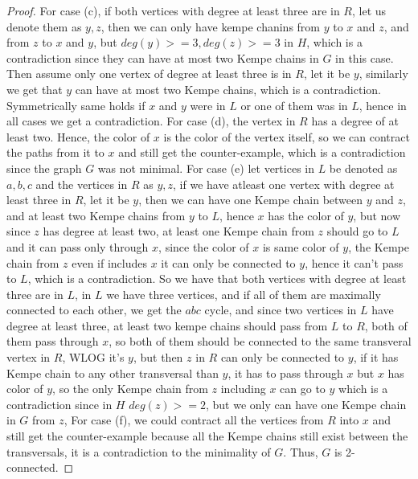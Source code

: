 \begin{proof}
    For case (c), if both vertices with degree at least three are in $R$, let us denote them as $y, z$, then we can only have kempe chanins from $y$
    to $x$ and $z$, and from $z$ to $x$ and $y$, but $deg(y) >= 3, deg(z) >= 3$ in $H$, which is a contradiction since they can have 
    at most two Kempe chains in $G$ in this case. Then assume only one vertex of degree at least three is in $R$, let it be $y$, similarly we get that $y$ can have
    at most two Kempe chains, which is a contradiction. Symmetrically same holds if $x$ and $y$ were in $L$ or one of them was in $L$, hence in all cases we get a contradiction.
    For case (d), the vertex in $R$ has a degree of at least two. Hence, the color of $x$ is the color of the vertex itself,
so we can contract the paths from it to $x$ and still get the counter-example, which is a contradiction since the graph $G$ was not minimal.
For case (e) let vertices in $L$ be denoted as $a,b,c$ and the vertices in $R$ as $y, z$, if we have atleast one vertex with degree at least three in $R$, let it be $y$, then we can have
one Kempe chain between $y$ and $z$, and at least two Kempe chains from $y$ to $L$, hence $x$ has the color of $y$, but now since $z$ has 
degree at least two, at least one Kempe chain from $z$ should go to $L$ and it can pass only through $x$, since the color of $x$ is same color of $y$, the 
Kempe chain from $z$ even if includes $x$ it can only be connected to $y$, hence it can't pass to $L$, which is a contradiction.
So we have that both vertices with degree at least three are in $L$, in $L$ we have three vertices, and if all of them are maximally connected to each other, 
we get the $abc$ cycle, and since two vertices in $L$ have degree at least three, at least two kempe chains should pass from $L$ to $R$, both of them pass through $x$, 
so both of them should be connected to the same transveral vertex in $R$, WLOG it's $y$, but then $z$ in $R$ can only be connected to $y$, if it has
Kempe chain to any other transversal than $y$, it has to pass through $x$ but $x$ has color of $y$, so the only Kempe chain from $z$ including $x$ can go to $y$
which is a contradiction since in $H$ $deg(z) >= 2$, but we only can have one Kempe chain in $G$ from $z$, For case (f), we could contract all the vertices from $R$ into $x$ and still get the counter-example
because all the Kempe chains still exist between the transversals, it is a contradiction to the minimality of $G$.
Thus, $G$ is 2-connected.
\end{proof}

